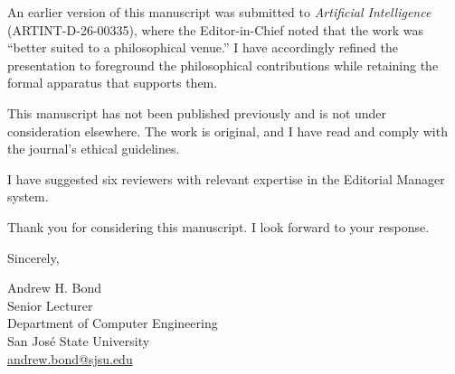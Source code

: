 \documentclass[12pt]{article}
\begin{document}
An earlier version of this manuscript was submitted to \textit{Artificial Intelligence} (ARTINT-D-26-00335), where the Editor-in-Chief noted that the work was ``better suited to a philosophical venue.'' I have accordingly refined the presentation to foreground the philosophical contributions while retaining the formal apparatus that supports them.

This manuscript has not been published previously and is not under consideration elsewhere. The work is original, and I have read and comply with the journal's ethical guidelines.

I have suggested six reviewers with relevant expertise in the Editorial Manager system.

Thank you for considering this manuscript. I look forward to your response.

\bigskip

\noindent
Sincerely,

\bigskip

\noindent
Andrew H. Bond\\
Senior Lecturer\\
Department of Computer Engineering\\
San Jos\'{e} State University\\
\href{mailto:andrew.bond@sjsu.edu}{andrew.bond@sjsu.edu}
\end{document}
